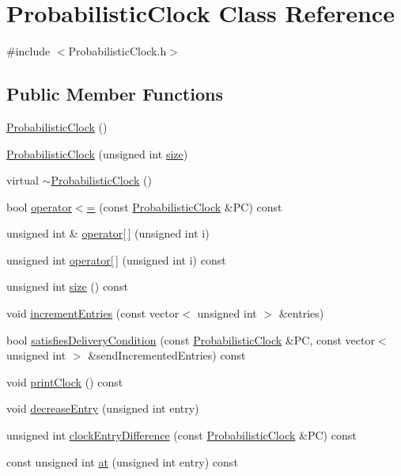 \hypertarget{class_probabilistic_clock}{}\section{Probabilistic\+Clock Class Reference}
\label{class_probabilistic_clock}


{\ttfamily \#include $<$Probabilistic\+Clock.\+h$>$}

\subsection*{Public Member Functions}
\begin{DoxyCompactItemize}
\item 
\hyperlink{class_probabilistic_clock_aa879f0e457bc70644b6e4f2114215987}{Probabilistic\+Clock} ()
\item 
\hyperlink{class_probabilistic_clock_ab356688e8403176b4211349cba56b9b1}{Probabilistic\+Clock} (unsigned int \hyperlink{class_probabilistic_clock_ad0cdbd2ad50309fae0665df4ee5247ba}{size})
\item 
virtual \hyperlink{class_probabilistic_clock_a11743513addcaaa0d8f0b0d0c74ae2ae}{$\sim$\+Probabilistic\+Clock} ()
\item 
bool \hyperlink{class_probabilistic_clock_a071b29d8c7ebb91528db4739a846dc71}{operator$<$=} (const \hyperlink{class_probabilistic_clock}{Probabilistic\+Clock} \&PC) const
\item 
unsigned int \& \hyperlink{class_probabilistic_clock_a349a0bcb8c21b89c3e6b30b043f16936}{operator\mbox{[}$\,$\mbox{]}} (unsigned int i)
\item 
unsigned int \hyperlink{class_probabilistic_clock_a28398d6b8c5a92b73a7d6260e3f3e7e1}{operator\mbox{[}$\,$\mbox{]}} (unsigned int i) const
\item 
unsigned int \hyperlink{class_probabilistic_clock_ad0cdbd2ad50309fae0665df4ee5247ba}{size} () const
\item 
void \hyperlink{class_probabilistic_clock_a5c510e2d21bc580468c491a71382a4d4}{increment\+Entries} (const vector$<$ unsigned int $>$ \&entries)
\item 
bool \hyperlink{class_probabilistic_clock_a56bced001a856aa04168d787cc2dd549}{satisfies\+Delivery\+Condition} (const \hyperlink{class_probabilistic_clock}{Probabilistic\+Clock} \&PC, const vector$<$ unsigned int $>$ \&send\+Incremented\+Entries) const
\item 
void \hyperlink{class_probabilistic_clock_a1169d9d5442d55c4dd4e2e730bc2b008}{print\+Clock} () const
\item 
void \hyperlink{class_probabilistic_clock_aaa864cb9c0e2cfcf0bf28a3f534e0c6a}{decrease\+Entry} (unsigned int entry)
\item 
unsigned int \hyperlink{class_probabilistic_clock_ad119fc48edd9537cfdb0ab77e640f614}{clock\+Entry\+Difference} (const \hyperlink{class_probabilistic_clock}{Probabilistic\+Clock} \&PC) const
\item 
const unsigned int \hyperlink{class_probabilistic_clock_a81a017c569c1a57e5c567b701a64e5c9}{at} (unsigned int entry) const
\end{DoxyCompactItemize}
